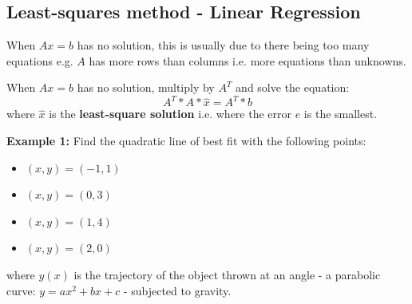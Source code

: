\documentclass[10pt,a4paper]{article}
\begin{document}
\subsection{Least-squares method - Linear Regression}

When $Ax=b$ has no solution, this is usually due to there being too many equations e.g. $A$ has more
rows than columns i.e. more equations than unknowns.

\begin{tcolorbox}[breakable,colback=white]
When $Ax=b$ has no solution, multiply by $A^T$ and solve the equation:
$$
	A^T*A*\hat{x}=A^T*b
$$
where $\hat{x}$ is the \textbf{least-square solution} i.e. where the error $e$ is the smallest.
\end{tcolorbox}

\textbf{Example 1:} Find the quadratic line of best fit with the following points:
\begin{multicols}{2}
	\begin{itemize}
		\item $(x,y) = (-1,1)$
		\item $(x,y) = 	(0,3)$
		\item $(x,y) = (1,4)$
		\item $(x,y) = (2,0)$
	\end{itemize}
\end{multicols}
where $y(x)$ is the trajectory of the object thrown at an angle - a parabolic curve: $y=ax^2+bx+c$ - subjected to gravity.
\end{document}
